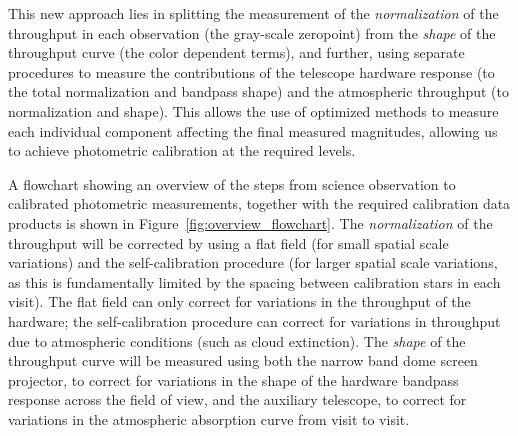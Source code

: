 \documentclass[12pt,preprint]{aastex}
\begin{document}
This new approach lies in splitting the measurement of the {\it
normalization} of the throughput in each observation (the gray-scale
zeropoint) from the {\it shape} of the throughput curve (the color
dependent terms), and further, using separate procedures to measure
the contributions of the telescope hardware response (to the total
normalization and bandpass shape) and the atmospheric throughput (to
normalization and shape). This allows the use of optimized methods to
measure each individual component affecting the final measured
magnitudes, allowing us to achieve photometric calibration at the
required levels.

A flowchart showing an overview of the steps from science observation
to calibrated photometric measurements, together with the required
calibration data products is shown in
Figure~\ref{fig:overview_flowchart}.  The {\it normalization} of the
throughput will be corrected by using a flat field (for small spatial
scale variations) and the self-calibration procedure (for larger
spatial scale variations, as this is fundamentally limited by the
spacing between calibration stars in each visit). The flat field can
only correct for variations in the throughput of the hardware; the
self-calibration procedure can correct for variations in throughput
due to atmospheric conditions (such as cloud extinction).  The {\it shape} of
the throughput curve will be measured using both the narrow band dome
screen projector, to correct for variations in the shape of the
hardware bandpass response across the field of view, and the auxiliary
telescope, to correct for variations in the atmospheric absorption
curve from visit to visit. 
\end{document}
